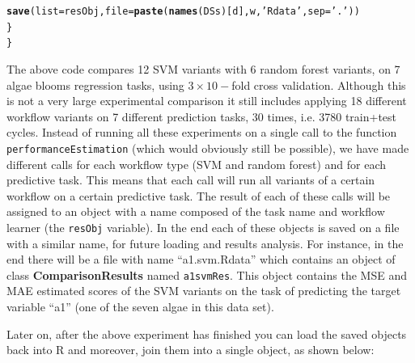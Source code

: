 \documentclass[10pt,a4paper]{article}\usepackage[]{graphicx}\usepackage[]{color}
\makeatletter
\newcommand{\hlstr}[1]{\textcolor[rgb]{0.192,0.494,0.8}{#1}}%
\newcommand{\hlstd}[1]{\textcolor[rgb]{0.345,0.345,0.345}{#1}}%
\newcommand{\hlkwc}[1]{\textcolor[rgb]{0.333,0.667,0.333}{#1}}%
\newcommand{\hlkwd}[1]{\textcolor[rgb]{0.737,0.353,0.396}{\textbf{#1}}}%
\newenvironment{kframe}{%
 \def\at@end@of@kframe{}%
 \ifinner\ifhmode%
  \def\at@end@of@kframe{\end{minipage}}%
  \begin{minipage}{\columnwidth}%
 \fi\fi%
 \def\FrameCommand##1{\hskip\@totalleftmargin \hskip-\fboxsep
 \colorbox{shadecolor}{##1}\hskip-\fboxsep
     \hskip-\linewidth \hskip-\@totalleftmargin \hskip\columnwidth}%
 \MakeFramed {\advance\hsize-\width
   \@totalleftmargin\z@ \linewidth\hsize
   \@setminipage}}%
 {\par\unskip\endMakeFramed%
 \at@end@of@kframe}
\newenvironment{knitrout}{}{} %
\makeatother
\begin{document}
\begin{knitrout}
\begin{kframe}
\begin{alltt}
    \hlkwd{save}\hlstd{(}\hlkwc{list}\hlstd{=resObj,}\hlkwc{file}\hlstd{=}\hlkwd{paste}\hlstd{(}\hlkwd{names}\hlstd{(DSs)[d],w,}\hlstr{'Rdata'}\hlstd{,}\hlkwc{sep}\hlstd{=}\hlstr{'.'}\hlstd{))}
  \hlstd{\}}
\hlstd{\}}
\end{alltt}
\end{kframe}
\end{knitrout}

The above code compares 12 SVM variants with 6 random forest variants,
on 7 algae blooms regression tasks, using $3\times 10-$fold cross
validation. Although this is not a very large experimental comparison
it still includes applying 18 different workflow variants on 7
different prediction tasks, 30 times, i.e. 3780 train+test
cycles. Instead of running all these experiments on a single call to
the function \texttt{performanceEstimation} (which would obviously
still be possible), we have made different calls for each workflow
type (SVM and random forest) and for each predictive task. This
means that each call will run all variants of a certain workflow on a
certain predictive task. The result of each of these calls will be
assigned to an object with a name composed of the task name and
workflow learner (the \texttt{resObj} variable). In the end each of
these objects is saved on a file with a similar name, for future
loading and results analysis. For instance, in the end there will be a
file with name ``a1.svm.Rdata'' which contains an object of class
\textbf{ComparisonResults} named \texttt{a1svmRes}. This object
contains the MSE and MAE estimated scores of the SVM variants on the
task of predicting the target variable ``a1'' (one of the seven algae
in this data set).

Later on, after the above experiment has finished you can load the saved objects back 
into R and moreover, join them into a single object, as shown below:
\end{document}
